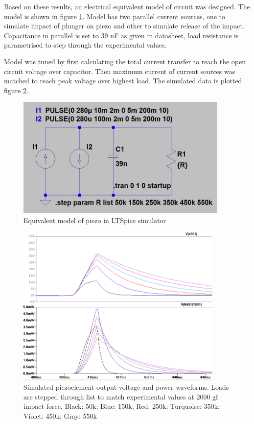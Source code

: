Based on these results, an electrical equivalent model of circuit was designed. The model is shown in figure \ref{fig:piezo_ltspice_equivalent}. Model has two parallel current sources, one to simulate impact of plunger on piezo and other to simulate release of the impact. Capacitance in parallel is set to 39 nF as given in datasheet, load resistance is parametrised to step through the experimental values. 

Model was tuned by first calculating the total current transfer to reach the open circuit voltage over capacitor. Then maximum current of current sources was matched to reach peak voltage over highest load.
The simulated data is plotted figure \ref{fiq:piezo_simulation_experimental}.

 \begin{figure}[htb]
  \begin{center}
  \includegraphics[height=6cm]{images/own_dwg/ltspice_piezo}
  \end{center}
  \caption{Equivalent model of piezo in LTSpice simulator}
  \label{fig:piezo_ltspice_equivalent}
\end{figure}

 \begin{figure}[htb]
  \begin{center}
  \includegraphics[height=8cm]{images/own_dwg/ltspice_piezo_simulation}
  \end{center}
  \caption{Simulated piezoelement output voltage and power waveforms. Loads are stepped through list to match experimental values at 2000 gf impact force. Black: 50k; Blue: 150k; Red: 250k; Turquoise: 350k; Violet: 450k; Gray: 550k}
  \label{fiq:piezo_simulation_experimental}
\end{figure}

